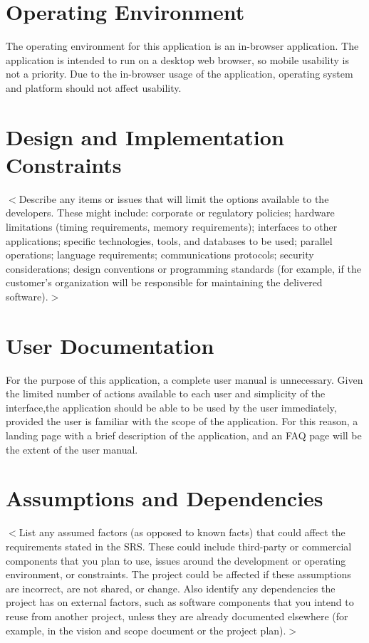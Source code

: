 \documentclass{scrreprt}
\begin{document}
\section{Operating Environment}
The operating environment for this application is an in-browser application. The
application is intended to run on a desktop web browser, so mobile usability is
not a priority. Due to the in-browser usage of the application, operating system
and platform should not affect usability.

\section{Design and Implementation Constraints}
$<$Describe any items or issues that will limit the options available to the
developers. These might include: corporate or regulatory policies; hardware
limitations (timing requirements, memory requirements); interfaces to other
applications; specific technologies, tools, and databases to be used; parallel
operations; language requirements; communications protocols; security
considerations; design conventions or programming standards (for example, if the
customer’s organization will be responsible for maintaining the delivered
software).$>$

\section{User Documentation}
For the purpose of this application, a complete user manual is unnecessary.
Given the limited number of actions available to each user and simplicity of the
interface,the application should be able to be used by the user immediately,
provided the user is familiar with the scope of the application. For this
reason, a landing page with a brief description of the application, and an FAQ
page will be the extent of the user manual.

\section{Assumptions and Dependencies}
$<$List any assumed factors (as opposed to known facts) that could affect the
requirements stated in the SRS. These could include third-party or commercial
components that you plan to use, issues around the development or operating
environment, or constraints. The project could be affected if these assumptions
are incorrect, are not shared, or change. Also identify any dependencies the
project has on external factors, such as software components that you intend to
reuse from another project, unless they are already documented elsewhere (for
example, in the vision and scope document or the project plan).$>$
\end{document}
